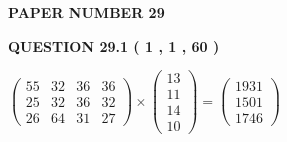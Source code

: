 \documentclass[12pt]{article}
\begin{document}
   
 {\textbf{ \Large{ PAPER NUMBER           29  }}}
   
   
   
   
  
  
{\textbf{\large{QUESTION
29.1 
 (           1 ,           1 ,          60 )
}}}

 
$\left( \begin{array}{ccccccccccccccc}
          55  & 
          32  & 
          36  & 
          36  \\ 
          25  & 
          32  & 
          36  & 
          32  \\ 
          26  & 
          64  & 
          31  & 
          27
\end{array}\right) \times
\left( \begin{array}{c}
          13  \\ 
          11  \\ 
          14  \\ 
          10
\end{array}\right)  =
\left( \begin{array}{c}
        1931  \\ 
        1501  \\ 
        1746
\end{array}\right)  $
 
\end{document}
